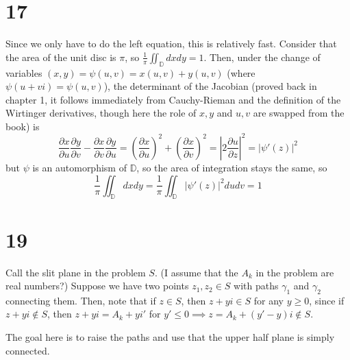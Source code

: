 \documentclass[12pt,letterpaper]{article}
\theoremstyle{definition}
\newcommand{\D}{\mathbb{D}}
\newcommand{\incfig}[1]{}
\begin{document}
\section*{17}

Since we only have to do the left equation, this is relatively fast. Consider that the area of the unit disc is $\pi$, so $\frac{1}{\pi}\iint_{\D}dxdy = 1$. Then, under the change of variables $(x, y) = \psi(u, v) = x(u, v) + y(u, v)$ (where $\psi(u + vi) = \psi(u, v)$), the determinant of the Jacobian (proved back in chapter 1, it follows immediately from Cauchy-Rieman and the definition of the Wirtinger derivatives, though here the role of $x,y$ and $u, v$ are swapped from the book) is
\[
  \frac{\partial x}{\partial u}\frac{\partial y}{\partial v} - \frac{\partial x}{\partial v}\frac{\partial y}{\partial u} = \left(\frac{\partial x}{\partial u}\right)^{2} + \left(\frac{\partial x}{\partial v}\right)^{2} = \left|2\frac{\partial u}{\partial z}\right|^{2} = |\psi'(z)|^{2}
\]
but $\psi$ is an automorphism of $\D$, so the area of integration stays the same, so
\[
  \frac{1}{\pi}\iint_{\D}dxdy = \frac{1}{\pi}\iint_{\D}|\psi'(z)|^{2}dudv = 1
\]

\section*{19}

Call the slit plane in the problem $S$. (I assume that the $A_{k}$ in the problem are real numbers?) Suppose we have two points $z_{1}, z_{2} \in S$ with paths $\gamma_{1}$ and $\gamma_{2}$ connecting them. Then, note that if $z \in S$, then $z + yi \in S$ for any $y \geq 0$, since if $z + yi \notin S$, then $z + yi = A_{k} + yi'$ for $y' \leq 0 \implies z = A_{k} + (y' - y)i \notin S$.

The goal here is to raise the paths and use that the upper half plane is simply connected.
\begin{figure}[H]
  \centering
  \incfig{homo}
\end{figure}
\end{document}

